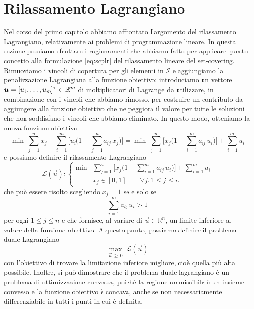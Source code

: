 \section{Rilassamento Lagrangiano}\label{sec:lagrangianrelaxationapplied}
Nel corso del primo capitolo abbiamo affrontato l'argomento del rilassamento Lagrangiano, relativamente ai problemi di
programmazione lineare. In questa sezione possiamo sfruttare i ragionamenti che abbiamo fatto per applicare questo
concetto alla formulazione \eqref{eq:scplr} del rilassamento lineare del set-covering. Rimuoviamo i vincoli di copertura
per gli elementi in \( \mathcal{I} \) e aggiungiamo la penalizzazione Lagrangiana alla funzione obiettivo: introduciamo
un vettore \( \bm{u} = [u_1, \ldots, u_m]^{\scriptscriptstyle\mathrm{T}} \in \mathbb{R}^m \) di moltiplicatori di Lagrange da utilizzare, in
combinazione con i vincoli che abbiamo rimosso, per costruire un contributo da aggiungere alla funzione obiettivo che ne
peggiora il valore per tutte le soluzioni che non soddisfano i vincoli che abbiamo eliminato. In questo modo, otteniamo
la nuova funzione obiettivo
\begin{equation}
    \min \; \sum_{j = 1}^n x_j + \sum_{i = 1}^m \Big[u_i \Big(1 - \sum_{j = 1}^n a_{ij}\, x_j\Big)\Big] =
    \min \; \sum_{j = 1}^n \Big[x_j\Big(1 - \sum_{i = 1}^m a_{ij}\, u_i \Big)\Big] + \sum_{i = 1}^m u_i
\end{equation}
e possiamo definire il rilassamento Lagrangiano
\begin{equation}\label{eq:Lu}
    \mathcal{L}(\vec{u})\colon
    \left\{
    \begin{array}{ll}
        \min & \displaystyle\sum_{j=1}^n \Big[x_j \Big(1 - \sum_{i = 1}^m a_{ij}\, u_i\Big)\Big] + \sum_{i = 1}^m u_i
        \\[20pt]
             & x_j \in [0, 1] \qquad \forall j\colon 1 \leq j \leq n
    \end{array}\right.
\end{equation}
che può essere risolto scegliendo \( x_j = 1\) se e solo se
\begin{equation}
    \sum_{i=1}^m a_{ij}\, u_i > 1
\end{equation}
per ogni \( 1 \leq j \leq n \) e che fornisce, al variare di \( \vec{u} \in \mathbb{R}^n \), un limite inferiore al valore della funzione
obiettivo. A questo punto, possiamo definire il problema duale Lagrangiano
\begin{equation}\label{eq:lagrangianduale}
    \max_{\vec{u} \,\geq\, 0}\; \mathcal{L}(\vec{u})
\end{equation}
con l'obiettivo di trovare la limitazione inferiore migliore, cioè quella più alta possibile. Inoltre, si può dimostrare
che il problema duale lagrangiano è un problema di ottimizzazione convessa, poiché la regione ammissibile è un insieme
convesso e la funzione obiettivo è concava, anche se non necessariamente differenziabile in tutti i punti in cui è
definita.


